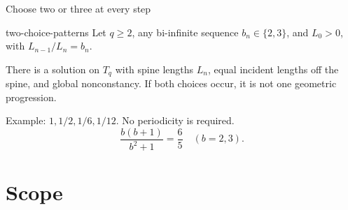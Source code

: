 \documentclass{beamer}
\begin{document}
\begin{frame}{Choose two or three at every step}
\begin{bookresult}{two-choice-patterns}
Let $q\ge2$, any bi-infinite sequence $b_n\in\{2,3\}$, and $L_0>0$, with $L_{n-1}/L_n=b_n$.

There is a solution on $T_q$ with spine lengths $L_n$, equal incident lengths off the spine, and global nonconstancy. If both choices occur, it is not one geometric progression.
\end{bookresult}
Example: $1,1/2,1/6,1/12$. No periodicity is required.
\[
\frac{b(b+1)}{b^2+1}=\frac65\quad(b=2,3).
\]
\end{frame}
\section{Scope}
\end{document}
